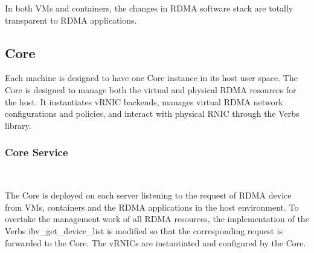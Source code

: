 In both VMs and containers, the changes in RDMA software stack are totally transparent to RDMA applications.

\subsection{\sys Core}

Each machine is designed to have one \sys Core instance in its host user space. The \sys Core is designed to manage both the virtual and physical RDMA resources for the host. It instantiates vRNIC backends, manages virtual RDMA network configurations and policies, and interact with physical RNIC through the Verbs library.



\subsubsection{\textbf{\sys Core Service}}
\
\noindent


The \sys Core is deployed on each server listening to the request of RDMA device from VMs, containers and the RDMA applications in the host environment. To overtake the management work of all RDMA resources, the implementation of the Verbs ibv\_get\_device\_list is modified so that the corresponding request is forwarded to the \sys Core. The vRNICs are instantiated and configured by the \sys Core.


